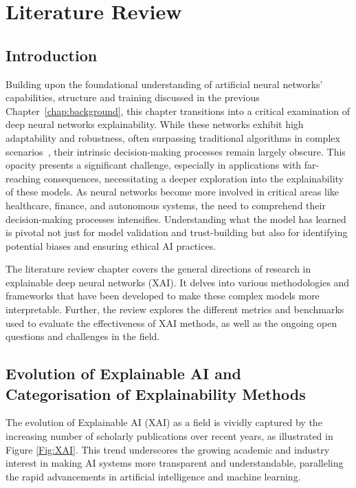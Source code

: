 \chapter{Literature Review}
\label{chap:lit}
\section{Introduction}

Building upon the foundational understanding of artificial neural networks' capabilities, structure and training discussed in the previous Chapter~\ref{chap:background}, this chapter transitions into a critical examination of deep neural networks explainability. While these networks exhibit high adaptability and robustness, often surpassing traditional algorithms in complex scenarios~\cite{HeZRS16, SilverHMGSDSAPL16, DengHK13, LeCunBH15}, their intrinsic decision-making processes remain largely obscure. This opacity presents a significant challenge, especially in applications with far-reaching consequences, necessitating a deeper exploration into the explainability of these models. As neural networks become more involved in critical areas like healthcare, finance, and autonomous systems, the need to comprehend their decision-making processes intensifies. Understanding what the model has learned is pivotal not just for model validation and trust-building but also for identifying potential biases and ensuring ethical AI practices. 

The literature review chapter covers the general directions of research in explainable deep neural networks (XAI). It delves into various methodologies and frameworks that have been developed to make these complex models more interpretable. Further, the review explores the different metrics and benchmarks used to evaluate the effectiveness of XAI methods, as well as the ongoing open questions and challenges in the field.

\section{Evolution of Explainable AI and Categorisation of Explainability Methods}

The evolution of Explainable AI (XAI) as a field is vividly captured by the increasing number of scholarly publications over recent years, as illustrated in Figure \ref{Fig:XAI}. This trend underscores the growing academic and industry interest in making AI systems more transparent and understandable, paralleling the rapid advancements in artificial intelligence and machine learning.

